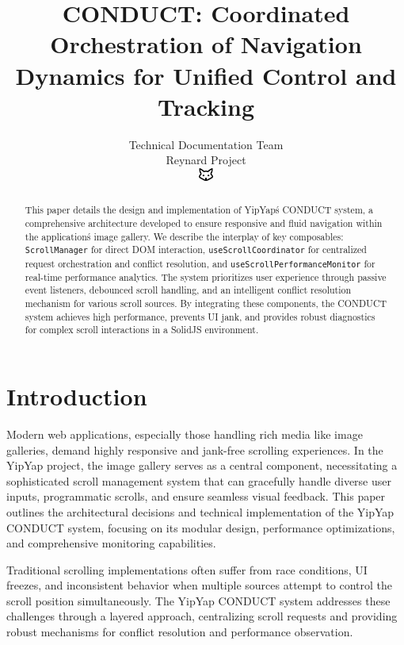 \documentclass[10pt]{article}
\begin{document}
\title{CONDUCT: Coordinated Orchestration of Navigation Dynamics for Unified Control and Tracking}

\author{Technical Documentation Team\\
Reynard Project\\
\includegraphics[width=0.5cm]{../../shared-assets/favicon.pdf}}

\maketitle

\begin{abstract}
This paper details the design and implementation of YipYap\'s CONDUCT system, 
a comprehensive architecture developed to ensure responsive and fluid navigation 
within the application\'s image gallery. We describe the interplay of key composables: 
\texttt{ScrollManager} for direct DOM interaction, \texttt{useScrollCoordinator} 
for centralized request orchestration and conflict resolution, and 
\texttt{useScrollPerformanceMonitor} for real-time performance analytics. 
The system prioritizes user experience through passive event listeners, 
debounced scroll handling, and an intelligent conflict resolution mechanism 
for various scroll sources. By integrating these components, the CONDUCT system 
achieves high performance, prevents UI jank, and provides robust diagnostics 
for complex scroll interactions in a SolidJS environment.
\end{abstract}

\section{Introduction}

Modern web applications, especially those handling rich media like image galleries, demand highly responsive and jank-free scrolling experiences. In the YipYap project, the image gallery serves as a central component, necessitating a sophisticated scroll management system that can gracefully handle diverse user inputs, programmatic scrolls, and ensure seamless visual feedback. This paper outlines the architectural decisions and technical implementation of the YipYap CONDUCT system, focusing on its modular design, performance optimizations, and comprehensive monitoring capabilities.

Traditional scrolling implementations often suffer from race conditions, UI freezes, and inconsistent behavior when multiple sources attempt to control the scroll position simultaneously. The YipYap CONDUCT system addresses these challenges through a layered approach, centralizing scroll requests and providing robust mechanisms for conflict resolution and performance observation.
\end{document}
